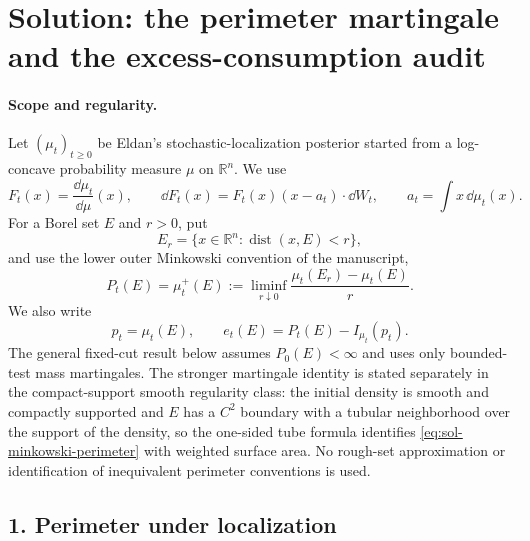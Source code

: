 \documentclass[../main.tex]{subfiles}
\begin{document}
%
\section*{Solution: the perimeter martingale and the excess-consumption audit}
\label{sec:sol-kls-excess-audit}

\paragraph{Scope and regularity.}
Let $(\mu_t)_{t\geq0}$ be Eldan's stochastic-localization posterior started from a
log-concave probability measure $\mu$ on $\mathbb R^n$.  We use
\[
  F_t(x)=\frac{\dd\mu_t}{\dd\mu}(x),\qquad
  \dd F_t(x)=F_t(x)(x-a_t)\mathbin\cdot\dd W_t,
  \qquad a_t=\int x\,\dd\mu_t(x).
\]
For a Borel set $E$ and $r>0$, put
\[
  E_r=\{x\in\mathbb R^n:\operatorname{dist}(x,E)<r\},
\]
and use the lower outer Minkowski convention of the manuscript,
\begin{equation}
  P_t(E)=\mu_t^+(E)
  :=\liminf_{r\downarrow0}\frac{\mu_t(E_r)-\mu_t(E)}r.
  \label{eq:sol-minkowski-perimeter}
\end{equation}
We also write
\[
  p_t=\mu_t(E),\qquad
  e_t(E)=P_t(E)-I_{\mu_t}(p_t).
\]
The general fixed-cut result below assumes $P_0(E)<\infty$ and uses only bounded-test mass
martingales.  The stronger martingale identity is stated separately in the compact-support
smooth regularity class: the initial density is smooth and compactly supported and $E$ has a
$C^2$ boundary with a tubular neighborhood over the support of the density, so the one-sided
tube formula identifies
\eqref{eq:sol-minkowski-perimeter} with weighted surface area.  No rough-set approximation or
identification of inequivalent perimeter conventions is used.

\subsection*{1. Perimeter under localization}
\end{document}
